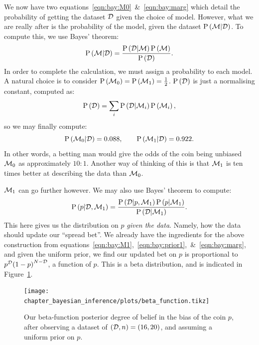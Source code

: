We now have two equations~\eqref{eqn:bay:M0}~\&~\eqref{eqn:bay:marg} which detail the probability of getting the dataset $\mathcal{D}$ given the choice of model. However, what we are really after is the probability of the model, given the dataset $\mathrm{P}\left(\mathcal{M}\middle|\mathcal{D}\right)$. To compute this, we use Bayes' theorem:
\begin{equation}
  \mathrm{P}\left(\mathcal{M}\middle|\mathcal{D}\right) = \frac{\mathrm{P}\left(\mathcal{D}\middle|\mathcal{M}\right)\mathrm{P}\left(\mathcal{M}\right)}{\mathrm{P}\left(\mathcal{D}\right)}.
  \label{eqn:bay:bay_md}
\end{equation}
In order to complete the calculation, we must assign a probability to each model. A natural choice is to consider $\mathrm{P}\left(\mathcal{M}_0\right)=\mathrm{P}\left(\mathcal{M}_1\right)=\frac{1}{2}$. $\mathrm{P}\left(\mathcal{D}\right)$ is just a normalising constant, computed as:
\begin{equation}
  \mathrm{P}\left(\mathcal{D}\right) = \sum_i \mathrm{P}\left(\mathcal{D}\middle|\mathcal{M}_i\right)\mathrm{P}\left(\mathcal{M}_i\right), 
  \label{eqn:bay:norm}
\end{equation}
so we may finally compute:
\begin{equation}
  \mathrm{P}\left(\mathcal{M}_0\middle|\mathcal{D}\right) = 0.088, \qquad
  \mathrm{P}\left(\mathcal{M}_1\middle|\mathcal{D}\right) = 0.922.
  \label{eqn:bay:comp}
\end{equation}
In other words, a betting man would give the odds of the coin being unbiased $\mathcal{M}_0$ as approximately $10:1$. Another way of thinking of this is that $\mathcal{M}_1$ is ten times better at describing the data than $\mathcal{M}_0$.

$\mathcal{M}_1$ can go further however. We may also use Bayes' theorem to compute:
\begin{equation}
  \mathrm{P}\left(p\middle|\mathcal{D},\mathcal{M}_1\right) = \frac{\mathrm{P}\left(\mathcal{D}\middle|p,\mathcal{M}_1\right)\mathrm{P}\left(p\middle|\mathcal{M}_1\right)}{\mathrm{P}\left(\mathcal{D}\middle|\mathcal{M}_1\right)}.
  \label{eqn:bay:bay_p}
\end{equation}
This here gives us the distribution on $p$ {\em given the data}. Namely, how the data should update our ``spread bet''. We already have the ingredients for the above construction from equations~\eqref{eqn:bay:M1},~\eqref{eqn:bay:prior1},~\&~\eqref{eqn:bay:marg}, and given the uniform prior, we find our updated bet on $p$ is proportional to $p^{\mathcal{D}}{(1-p)}^{N-\mathcal{D}}$, a function of $p$. This is a beta distribution, and is indicated in Figure~\ref{fig:bay:beta}.

\begin{figure}[tbp]
  \centering
  \ifdefined\lightweight{}
  \else
  \texttt{[image: chapter\_bayesian\_inference/plots/beta\_function.tikz]}
  \fi
  \caption{%
  Our beta-function posterior degree of belief in the bias of the coin $p$, after observing a dataset of $(\mathcal{D},n)=(16,20)$, and assuming a uniform prior on $p$.\label{fig:bay:beta}
}
\end{figure}

